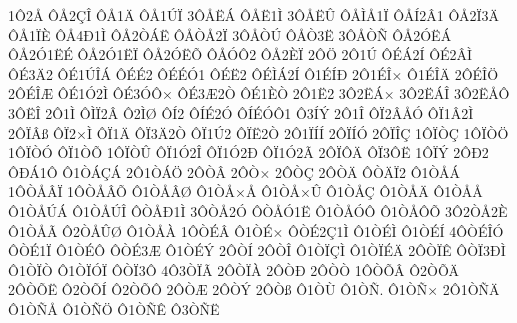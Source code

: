 {1^^d42^^c5
^^d4^^c52^^c7^^ce
^^d4^^c51^^c4
^^d4^^c51^^da^^cf
3^^d4^^c5^^cb^^c1
^^d4^^c5^^cb1^^cc
3^^d4^^c5^^cb^^db
^^d4^^c5^^cc^^c51^^cf
^^d4^^c5^^cd2^^c21
^^d4^^c52^^cf3^^c4
^^d4^^c51^^cf^^c8
^^d4^^c54^^d01^^cc
^^d4^^c52^^d2^^c1^^cb
^^d4^^c5^^d2^^c52^^cf
3^^d4^^c5^^d2^^da
^^d4^^c5^^d23^^cb
3^^d4^^c5^^d2^^d1
^^d4^^c52^^d3^^cb^^c1
^^d4^^c52^^d31^^cb^^c9
^^d4^^c52^^d31^^cb^^cf
^^d4^^c52^^d3^^cb^^d5
^^d4^^c5^^d3^^d42
^^d4^^c52^^c8^^cf
2^^d4^^d6
2^^d41^^da
^^d4^^c9^^c12^^cd
^^d4^^c92^^c2^^cc
^^d4^^c93^^c42
^^d4^^c91^^da^^ce^^c1
^^d4^^c9^^c92
^^d4^^c9^^c9^^d31
^^d4^^c9^^cb2
^^d4^^c9^^cc^^c12^^cd
^^d41^^c9^^cd^^d0
2^^d41^^c9^^ce^^d7
^^d41^^c9^^ce^^c4
2^^d4^^c9^^ce^^d6
2^^d4^^c9^^ce^^c6
^^d4^^c91^^d32^^cc
^^d4^^c93^^d3^^d4^^d7
^^d4^^c93^^c62^^d2
^^d4^^c91^^c8^^d2
2^^d41^^cb2
3^^d42^^cb^^c1^^d7
3^^d42^^cb^^c1^^ce
3^^d42^^cb^^c5^^d4
3^^d4^^cb^^ce
2^^d41^^cc
^^d4^^cc^^cf2^^c2
^^d42^^cc^^d8
^^d4^^cd2
^^d4^^cd^^c92^^d3
^^d4^^cd^^c9^^d3^^d41
^^d43^^cd^^dd
2^^d41^^ce
^^d4^^cf2^^c2^^c5^^d3
^^d4^^cf1^^c22^^cc
2^^d4^^cf^^c2^^df
^^d4^^cf2^^d7^^cc
^^d4^^cf1^^c4
^^d4^^cf3^^c42^^d2
^^d4^^cf1^^da2
^^d4^^cf^^cb2^^d2
2^^d41^^cf^^cd^^cd
2^^d4^^cf^^cd^^d3
2^^d4^^cf^^ce^^c7
1^^d4^^cf^^d2^^c7
1^^d4^^cf^^d2^^d6
1^^d4^^cf^^d2^^d3
^^d4^^cf1^^d2^^d5
1^^d4^^cf^^d2^^db
^^d4^^cf1^^d32^^ce
^^d4^^cf1^^d32^^d0
^^d4^^cf1^^d32^^c3
2^^d4^^cf^^d4^^c4
^^d4^^cf3^^d4^^cb
1^^d4^^cf^^dd
2^^d4^^d02
^^d4^^d0^^c11^^d4
^^d41^^d2^^c1^^c7^^c1
2^^d41^^d2^^c1^^d6
2^^d4^^d2^^c2
2^^d4^^d2^^d7
2^^d4^^d2^^c7
2^^d4^^d2^^c4
^^d4^^d2^^c4^^cf2
^^d41^^d2^^c5^^c1
1^^d4^^d2^^c5^^c2^^cf
1^^d4^^d2^^c5^^c2^^d5
^^d41^^d2^^c5^^c2^^d8
^^d41^^d2^^c5^^d7^^c5
^^d41^^d2^^c5^^d7^^db
^^d41^^d2^^c5^^c7
^^d41^^d2^^c5^^c4
^^d41^^d2^^c5^^c5
^^d41^^d2^^c5^^da^^c1
^^d41^^d2^^c5^^da^^ce
^^d4^^d2^^c5^^d01^^cc
3^^d4^^d2^^c52^^d3
^^d4^^d2^^c5^^d31^^cb
^^d41^^d2^^c5^^d3^^d4
^^d41^^d2^^c5^^d4^^d5
3^^d42^^d2^^c52^^c8
^^d41^^d2^^c5^^c3
^^d42^^d2^^c5^^db^^d8
^^d41^^d2^^c5^^c0
1^^d4^^d2^^c9^^c2
^^d41^^d2^^c9^^d7
^^d4^^d2^^c92^^c71^^cc
^^d41^^d2^^c9^^cc
^^d41^^d2^^c9^^cd
4^^d4^^d2^^c9^^ce^^d3
^^d4^^d2^^c91^^cf
^^d41^^d2^^c9^^d4
^^d4^^d2^^c93^^c6
^^d41^^d2^^c9^^dd
2^^d4^^d2^^cd
2^^d4^^d2^^ce
^^d41^^d2^^cf^^c7^^cc
^^d41^^d2^^cf^^c9^^c4
2^^d4^^d2^^cf^^ca
^^d4^^d2^^cf3^^d0^^cc
^^d41^^d2^^cf^^d2
^^d41^^d2^^cf^^d3^^cf
^^d4^^d2^^cf3^^d4
4^^d43^^d2^^cf^^c3
2^^d4^^d2^^cf^^c0
2^^d4^^d2^^d0
2^^d4^^d2^^d2
1^^d4^^d2^^d5^^c2
^^d42^^d2^^d5^^c4
2^^d4^^d2^^d5^^cb
^^d42^^d2^^d5^^cd
^^d42^^d2^^d5^^d4
2^^d4^^d2^^c6
2^^d4^^d2^^dd
2^^d4^^d2^^df
^^d41^^d2^^d9
^^d41^^d2^^d1.
^^d41^^d2^^d1^^d7
2^^d41^^d2^^d1^^c4
^^d41^^d2^^d1^^c5
^^d41^^d2^^d1^^d6
^^d41^^d2^^d1^^ca
^^d43^^d2^^d1^^cb
}
